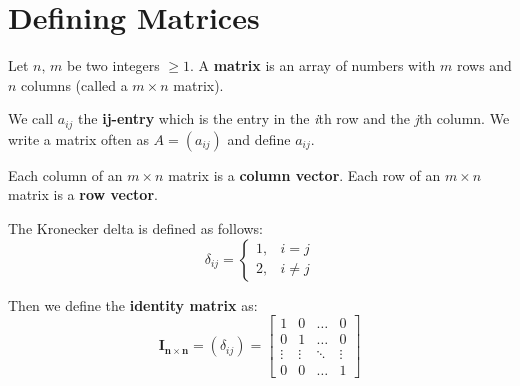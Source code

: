 \documentclass[../main.tex]{subfiles}
\begin{document}

\section{Defining Matrices}

Let \( n,\, m \) be two integers \( \geq 1 \).
A \textbf{matrix} is an array of numbers with \( m \) rows and \( n \) columns (called a \( m \times n \) matrix).

We call \textbf{\( a_{ij} \)} the \textbf{ij-entry} which is the entry in the \textit{i}th row and the \textit{j}th column.
We write a matrix often as \( A=(a_{ij}) \) and define \( a_{ij} \).

Each column of an \( m \times n \) matrix is a \textbf{column vector}.
Each row of an \( m \times n \) matrix is a \textbf{row vector}.

\begin{example}
    The Kronecker delta is defined as follows:
    \[
        \delta_{ij} =
        \begin{cases}
            1,& i = j \\
            2,& i \neq j
        \end{cases}
    \]

    Then we define the \textbf{identity matrix} as:
    \[ \mathbf{I_{n \times n}} = (\delta_{ij}) =
        \begin{bmatrix}
            1 & 0 &  \dots  & 0 \\
            0 & 1 & \dots & 0 \\
            \vdots & \vdots & \ddots & \vdots \\
            0 & 0 & \dots  & 1
        \end{bmatrix}
    \]
\end{example}
\end{document}

